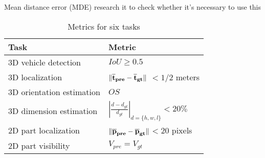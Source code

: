 Mean distance error (MDE) \tbd research it to check whether it's necessary to use this

\renewcommand{\arraystretch}{1.5}
\begin{table}[ht]
	\centering
	\caption{Metrics for six tasks}
	\label{my-label}
	\begin{tabular}{|m{6cm}|m{6cm}|}
		\hline
		Task                    & Metric         \\ \hline
		3D vehicle detection    & $IoU \geq 0.5$ \\  \hline
		3D localization         &$\bf \lVert \overline t_{pre} - \overline t_{gt} \rVert$ $< 1 / 2$ meters   \\ \hline
		3D orientation estimation  & $OS$     \\ \hline
		3D dimension estimation & $\left | \frac{d-d_{gt}}{d_{gt}} \right | _{d =\{h,w,l\}}<  20\%$           \\ \hline
		2D part localization    & $ \bf \lVert \overline p_{pre} - \overline p_{gt} \rVert $$<  20$ pixels      \\ \hline
		2D part visibility      &     $V_{pre} = V_{gt}$         \\ \hline
	\end{tabular}
\end{table}
